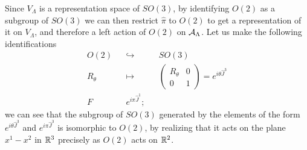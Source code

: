 Since $V_\Lambda$ is a representation space of $SO(3)$, by identifying $O(2)$ as a subgroup of $SO(3)$ we can then restrict $\hat \pi$ to $O(2)$ to get a representation of it on $V_\Lambda$, and therefore a left action of $O(2)$ on $\mathcal A_\Lambda$. Let us make the following identifications
\begin{align*}
    O(2) && \hookrightarrow && SO(3)\\
    R_\theta && \mapsto && \begin{pmatrix} R_\theta & 0 \\ 0 & 1 \end{pmatrix} = e^{i\theta \hat J^3}\\
    F && e^{i\pi \hat J^1};
\end{align*}
we can see that the subgroup of $SO(3)$ generated by the elements of the form $e^{i\theta \hat J^3}$ and $e^{i\pi \hat J^3}$ is isomorphic to $O(2)$, by realizing that it acts on the plane $x^1-x^2$ in $\mathbb{R}^3$ precisely as $O(2)$ acts on $\mathbb{R}^2$.

